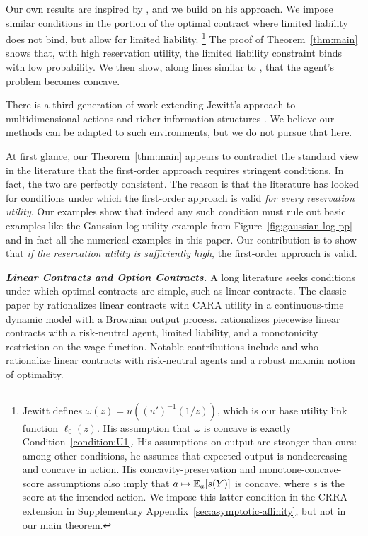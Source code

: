 Our own results are inspired by \textcite{jewitt1988justifying}, and we build on his approach. We impose similar conditions in the portion of the optimal contract where limited liability does not bind, but allow for limited liability.%
\footnote{Jewitt defines $\omega(z)=u((u')^{-1}(1/z))$, which is our base utility link function $\ell_0(z)$. His assumption that $\omega$ is concave is exactly Condition~\eqref{condition:U1}. His assumptions on output are stronger than ours: among other conditions, he assumes that expected output is nondecreasing and concave in action. His concavity-preservation and monotone-concave-score assumptions also imply that $a\mapsto\mathbb{E}_a[s(Y)]$ is concave, where $s$ is the score at the intended action. We impose this latter condition in the CRRA extension in Supplementary Appendix~\ref{sec:asymptotic-affinity}, but not in our main theorem.}
The proof of Theorem~\ref{thm:main} shows that, with high reservation utility, the limited liability constraint binds with low probability. We then show, along lines similar to \textcite{jewitt1988justifying}, that the agent's problem becomes concave.

There is a third generation of work extending Jewitt's approach to multidimensional actions and richer information structures \parencite{conlon2009two,jung2015information,chade2020no,chaigneau2022should,jung2024proxy}. We believe our methods can be adapted to such environments, but we do not pursue that here.

At first glance, our Theorem~\ref{thm:main} appears to contradict the standard view in the literature that the first-order approach requires stringent conditions. In fact, the two are perfectly consistent. The reason is that the literature has looked for conditions under which the first-order approach is valid \emph{for every reservation utility}. Our examples show that indeed any such condition must rule out basic examples like the Gaussian-log utility example from Figure~\ref{fig:gaussian-log-pp} -- and in fact all the numerical examples in this paper. Our contribution is to show that \emph{if the reservation utility is sufficiently high}, the first-order approach is valid.


\medskip\noindent\textit{\textbf{Linear Contracts and Option Contracts.}}
A long literature seeks conditions under which optimal contracts are simple, such as linear contracts. The classic paper by \textcite{holmstrom1987aggregation} rationalizes linear contracts with CARA utility in a continuous-time dynamic model with a Brownian output process. \textcite{innes1990limited} rationalizes piecewise linear contracts with a risk-neutral agent, limited liability, and a monotonicity restriction on the wage function. Notable contributions include \textcite{chassang2013calibrated} and \textcite{carroll2015robustness} who rationalize linear contracts with risk-neutral agents and a robust maxmin notion of optimality.

